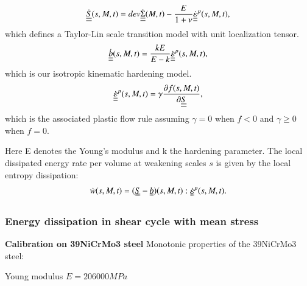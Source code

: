 \documentclass[3p,times,procedia,number]{elsarticle}
\begin{document}

\begin{equation}
	\dot{\uline{\uline{S}}}(s,M,t)=dev\dot{\uline{\uline{\Sigma}}}(M,t)-\dfrac{E}{1+\nu}\dot{\uline{\uline{\varepsilon}}}^p(s,M,t), 
\end{equation}
which defines a Taylor-Lin scale transition model with unit localization tensor\cite{Bosia201239}.
\begin{equation}
	\dot{\uline{\uline{b}}}(s,M,t)=\dfrac{kE}{E-k} \dot{\uline{\uline{\varepsilon}}}^p(s,M,t), 
\end{equation}
which is our isotropic kinematic hardening model.
\begin{equation}
	\dot{\uline{\uline{\varepsilon}}}^p(s,M,t)=\gamma\dfrac{\partial f(s,M,t)}{\partial \uline{\uline{S}}}, 
\end{equation}
which is the associated plastic flow rule assuming $\gamma=0$ when $f<0$ and  $\gamma\geqslant0$ when $f=0$.

Here E denotes the Young's modulus and k the hardening parameter. The local dissipated energy rate per volume at weakening scales $s$  is given by the local entropy dissipation:
\begin{equation}
	\dot{w}(s,M,t)=(\uuline{S}-\uuline{b})(s,M,t):\uuline{\dot{\varepsilon}}^p(s,M,t).
	\label{dissipated}
\end{equation}


\subsubsection{Energy dissipation in shear cycle with mean stress}
\textbf{Calibration on 39NiCrMo3 steel}
Monotonic properties of the 39NiCrMo3 steel:

\noindent
Young modulus $E=206000 MPa$
\end{document}
